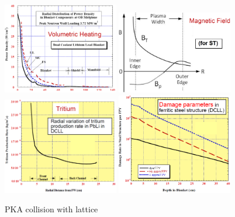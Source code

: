 \documentclass[11pt]{article}
\begin{document}
\begin{figure}
  \includegraphics[width=0.45\textwidth]{figs/fig4.png}
  \includegraphics[width=0.45\textwidth]{figs/fig6.png}
  \includegraphics[width=0.45\textwidth]{figs/fig5.png}
  \includegraphics[width=0.45\textwidth]{figs/fig7.png}
  \caption{PKA collision with lattice}
\end{figure}
\end{document}
